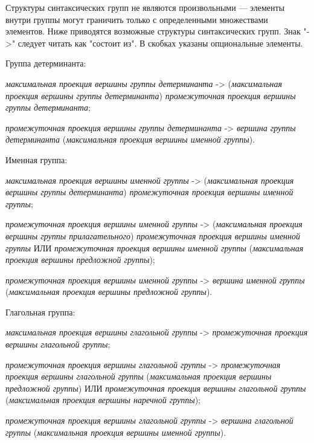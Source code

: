 Структуры синтаксических групп не являются произвольными --- элементы внутри группы могут граничить только с определенными множествами элементов.
Ниже приводятся возможные структуры синтаксических групп.
Знак "->"{} следует читать как "состоит из"{}.
В скобках указаны опциональные элементы.

Группа детерминанта:
\begin{textitemize}
    \item \textit{максимальная проекция вершины группы детерминанта} -> (\textit{максимальная проекция вершины группы детерминанта}) \textit{промежуточная проекция вершины группы детерминанта};
    \item \textit{промежуточная проекция вершины группы детерминанта} -> \textit{вершина группы детерминанта} (\textit{максимальная проекция вершины именной группы}).
\end{textitemize}

Именная группа:
\begin{textitemize}
    \item \textit{максимальная проекция вершины именной группы} -> (\textit{максимальная проекция вершины группы детерминанта}) \textit{промежуточная проекция вершины именной группы};
    \item \textit{промежуточная проекция вершины именной группы} -> (\textit{максимальная проекция вершины группы прилагательного}) \textit{промежуточная проекция вершины именной группы} ИЛИ \textit{промежуточная проекция вершины именной группы} (\textit{максимальная проекция вершины предложной группы});
    \item \textit{промежуточная проекция вершины именной группы} -> \textit{вершина именной группы} (\textit{максимальная проекция вершины предложной группы}).
\end{textitemize}

Глагольная группа:
\begin{textitemize}
    \item \textit{максимальная проекция вершины глагольной группы} -> \textit{промежуточная проекция вершины глагольной группы};
    \item \textit{промежуточная проекция вершины глагольной группы} -> \textit{промежуточная проекция вершины глагольной группы} (\textit{максимальная проекция вершины предложной группы}) ИЛИ \textit{промежуточная проекция вершины глагольной группы} (\textit{максимальная проекция вершины наречной группы});
    \item \textit{промежуточная проекция вершины глагольной группы} -> \textit{вершина глагольной группы} (\textit{максимальная проекция вершины именной группы}).
\end{textitemize}


